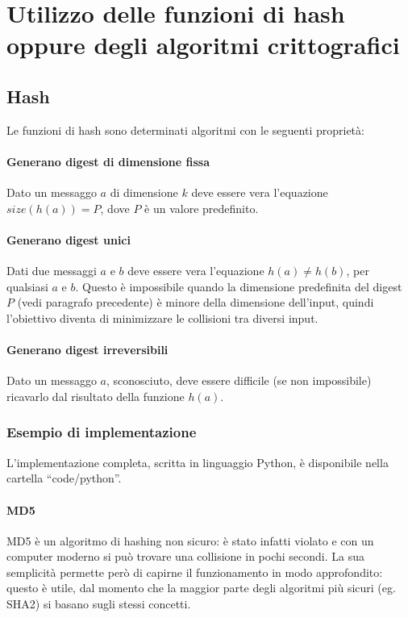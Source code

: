\section{Utilizzo delle funzioni di hash oppure degli algoritmi crittografici}

\subsection{Hash}

Le funzioni di hash sono determinati algoritmi con le seguenti proprietà:

\paragraph{Generano digest di dimensione fissa}
Dato un messaggo $a$ di dimensione $k$ deve essere vera l'equazione $size(h(a)) = P$, dove $P$ è un valore predefinito.

\paragraph{Generano digest unici}
Dati due messaggi $a$ e $b$ deve essere vera l'equazione $h(a) \neq h(b)$, per qualsiasi $a$ e $b$. Questo è impossibile quando la dimensione predefinita del digest $P$ (vedi paragrafo precedente) è minore della dimensione dell'input, quindi l'obiettivo diventa di minimizzare le collisioni tra diversi input.

\paragraph{Generano digest irreversibili}
Dato un messaggo $a$, sconosciuto, deve essere difficile (se non impossibile) ricavarlo dal risultato della funzione $h(a)$.

\subsubsection{Esempio di implementazione}

\small{L'implementazione completa, scritta in linguaggio Python, è disponibile nella cartella ``code/python''.}

\paragraph{MD5}
MD5 è un algoritmo di hashing non sicuro: è stato infatti violato e con un computer moderno si può trovare una collisione in pochi secondi. La sua semplicità permette però di capirne il funzionamento in modo approfondito: questo è utile, dal momento che la maggior parte degli algoritmi più sicuri (eg. SHA2) si basano sugli stessi concetti.

